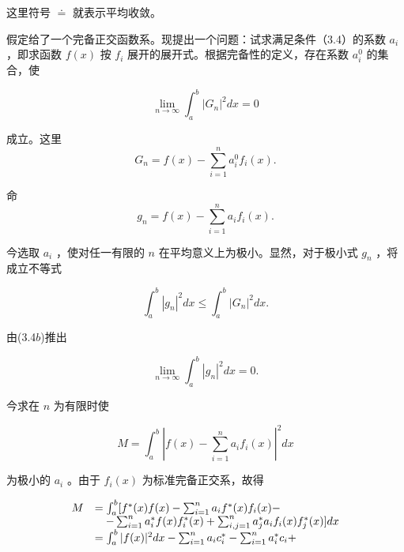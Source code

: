 这里符号 $\doteq$ 就表示平均收敛。

假定给了一个完备正交函数系。现提出一个问题：试求满足条件（3.4）的系数 $a_{i}$ ，即求函数 $f(x)$ 按 $f_{i}$ 展开的展开式。根据完备性的定义，存在系数 $a_{i}^{0}$ 的集合，使

\begin{equation*}
\lim _ {n \rightarrow \infty} \int_ {a} ^ {b} | G _ {n} | ^ {2} d x = 0\tag{3.4b}
\end{equation*}

成立。这里
\begin{equation*}
G _ {n} = f (x) - \sum_ {i = 1} ^ {n} a _ {i} ^ {0} f _ {i} (x).
\end{equation*}

命
\begin{equation*}
g _ {n} = f (x) - \sum_ {i = 1} ^ {n} a _ {i} f _ {i} (x).
\end{equation*}

今选取 $a_{i}$ ，使对任一有限的 $n$ 在平均意义上为极小。显然，对于极小式 $g_{n}$ ，将成立不等式

\begin{equation*}
\int_ {a} ^ {b} \left| g _ {n} \right| ^ {2} d x \leqslant \int_ {a} ^ {b} \left| G _ {n} \right| ^ {2} d x.
\end{equation*}

由(3.4$b$)推出

\begin{equation*}
\lim _ {n \rightarrow \infty} \int_ {a} ^ {b} | g _ {n} | ^ {2} d x = 0.
\end{equation*}

今求在 $n$ 为有限时使

\begin{equation*}
M = \int_ {a} ^ {b} | f (x) - \sum_ {i = 1} ^ {n} a _ {i} f _ {i} (x) | ^ {2} d x
\end{equation*}

为极小的 $a_{i}$ 。由于 $f_{i}(x)$ 为标准完备正交系，故得

\begin{equation*}
\begin{array}{r l} M & = \int_ {a} ^ {b} [ f ^ {*} (x) f (x) - \sum_ {i = 1} ^ {n} a _ {i} f ^ {*} (x) f _ {i} (x) - \\ & \quad - \sum_ {i = 1} ^ {n} a _ {i} ^ {*} f (x) f _ {i} ^ {*} (x) + \sum_ {i, j = 1} ^ {n} a _ {j} ^ {*} a _ {i} f _ {i} (x) f _ {j} ^ {*} (x) ] d x \\ & = \int_ {a} ^ {b} | f (x) | ^ {2} d x - \sum_ {i = 1} ^ {n} a _ {i} c _ {i} ^ {*} - \sum_ {i = 1} ^ {n} a _ {i} ^ {*} c _ {i} + \end{array}
\end{equation*}

